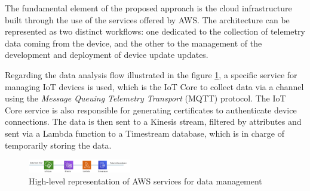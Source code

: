 \documentclass[10pt,a4paper,roman, twocolumn]{article}
\begin{document}
The fundamental element of the proposed approach is the cloud infrastructure built through the use of the services offered by AWS. The architecture can be represented as two distinct workflows: one dedicated to the collection of telemetry data coming from the device, and the other to the management of the development and deployment of device update updates.

Regarding the data analysis flow illustrated in the figure \ref{fig:AWSDataServices}, a specific service for managing IoT devices is used, which is the IoT Core to collect data via a channel using the \textit{Message Queuing Telemetry Transport} (MQTT) protocol. The IoT Core service is also responsible for generating certificates to authenticate device connections. The data is then sent to a Kinesis stream, filtered by attributes and sent via a Lambda function to a Timestream database, which is in charge of temporarily storing the data.
\begin{figure} [tbh]
	\centerline{\includegraphics[width=0.4\textwidth]{images/AWS_data_services.png}}
	\caption{High-level representation of AWS services for data management}
	\label{fig:AWSDataServices}
\end{figure}
\end{document}
